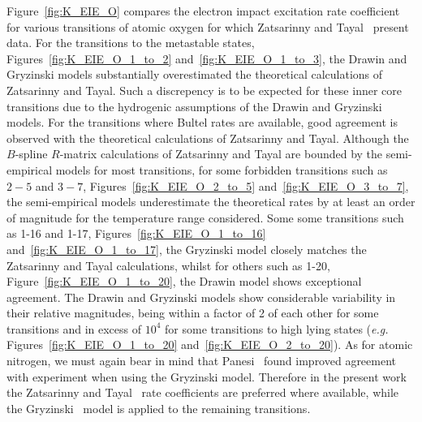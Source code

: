 {Figure~\ref{fig:K_EIE_O} compares the electron impact excitation rate coefficient for various transitions of atomic oxygen for which Zatsarinny and Tayal~\cite{ZT2003} present data.
For the transitions to the metastable states, Figures~\ref{fig:K_EIE_O_1_to_2} and~\ref{fig:K_EIE_O_1_to_3}, the Drawin and Gryzinski models substantially overestimated the theoretical calculations of Zatsarinny and Tayal.
Such a discrepency is to be expected for these inner core transitions due to the hydrogenic assumptions of the Drawin and Gryzinski models.
For the transitions where Bultel rates are available, good agreement is observed with the theoretical calculations of Zatsarinny and Tayal.
Although the $B$-spline $R$-matrix calculations of Zatsarinny and Tayal are bounded by the semi-empirical models for most transitions, for some forbidden transitions such as $2-5$ and $3-7$, Figures~\ref{fig:K_EIE_O_2_to_5} and~\ref{fig:K_EIE_O_3_to_7}, the semi-empirical models underestimate the theoretical rates by at least an order of magnitude for the temperature range considered.
Some some transitions such as 1-16 and 1-17, Figures~\ref{fig:K_EIE_O_1_to_16} and~\ref{fig:K_EIE_O_1_to_17}, the Gryzinski model closely matches the Zatsarinny and Tayal calculations, whilst for others such as 1-20, Figure~\ref{fig:K_EIE_O_1_to_20}, the Drawin model shows exceptional agreement.
The Drawin and Gryzinski models show considerable variability in their relative magnitudes, being within a factor of 2 of each other for some transitions and in excess of $10^4$ for some transitions to high lying states (\textit{e.g.} Figures~\ref{fig:K_EIE_O_1_to_20} and~\ref{fig:K_EIE_O_2_to_20}).
As for atomic nitrogen, we must again bear in mind that Panesi~\cite{panesi_2008B,panesi_phd} found improved agreement with experiment when using the Gryzinski model.
Therefore in the present work the Zatsarinny and Tayal~\cite{ZT2003} rate coefficients are preferred where available, while the Gryzinski~\cite{Gryz59} model is applied to the remaining transitions.

}
